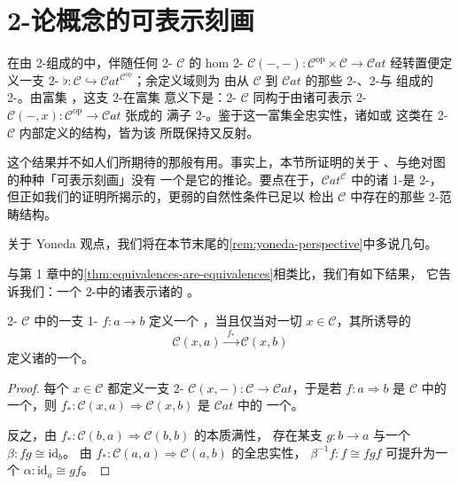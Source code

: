 
\providecommand{\Cat}{\mathcal{C}at}

\section{2-\trCategory{}论概念的可表示刻画}\label{sec:representable-characterizations}

在由 2-\trCategory{}组成的\trCartesianClosed{}\trCategory{}中，伴随任何%
2-\trCategory{} $\mathcal{C}$ 的 hom 2-\trFunctor{}
$\mathcal{C}(-,-)\colon\mathcal{C}^{\mathrm{op}}\times\mathcal{C}\to\Cat$
经转置便定义一支 \trYonedaEmbedding{} 2-\trFunctor{}
$\flat\colon\mathcal{C}\hookrightarrow\Cat^{\mathcal{C}^{\mathrm{op}}}$；余定义域则为
由从 $\mathcal{C}$ 到 $\Cat$ 的那些 2-\trFunctor、2-\trNaturalTransformation{}与%
\trModification{}组成的 2-\trCategory。由富集 \trYonedaLemma，这支 2-\trFunctor{}在富集
意义下是\trFullyFaithful：2-\trCategory{} $\mathcal{C}$ 同构于由诸可表示%
2-\trFunctor{} $\mathcal{C}(-,x)\colon\mathcal{C}^{\mathrm{op}}\to\Cat$ 张成的
满子 2-\trCategory。鉴于这一富集全忠实性，诸如\trEquivalence{}或%
\trAdjunction{}这类在 2-\trCategory{} $\mathcal{C}$ 内部定义的结构，皆为该%
\trYonedaEmbedding{}所既保持又反射。

这个结果并不如人们所期待的那般有用。事实上，本节所证明的关于%
\trEquivalence、\trAdjunction{}与绝对\trLifting{}图的种种「可表示刻画」没有
一个是它的推论。要点在于，$\Cat^{\mathcal{C}}$ 中的诸 1-\trCell{}是%
2-\trNaturalTransformation，但正如我们的证明所揭示的，更弱的自然性条件已足以
检出 $\mathcal{C}$ 中存在的那些 2-范畴结构。

关于 Yoneda 观点，我们将在本节末尾的\cref{rem:yoneda-perspective}中多说几句。

与第 1 章中的\cref{thm:equivalences-are-equivalences}相类比，我们有如下结果，
它告诉我们：一个 2-\trCategory{}中的诸\trEquivalence{}表示诸\trCategory{}的%
\trEquivalence。

\begin{proposition}\label{prop:equivalences-representably-defined}
2-\trCategory{} $\mathcal{C}$ 中的一支 1-\trCell{} $f\colon a\to b$ 定义一个%
\trEquivalence，当且仅当对一切 $x\in\mathcal{C}$，其所诱导的\trFunctor
\[
\mathcal{C}(x,a)\xrightarrow{\;f_{\ast}\;}\mathcal{C}(x,b)
\]
定义诸\trCategory{}的一个\trEquivalence。
\end{proposition}

\begin{proof}
每个 $x\in\mathcal{C}$ 都定义一支 2-\trFunctor{}
$\mathcal{C}(x,-)\colon\mathcal{C}\to\Cat$，于是若 $f\colon a\Rightarrow b$
是 $\mathcal{C}$ 中的一个\trEquivalence，则
$f_{\ast}\colon\mathcal{C}(x,a)\Rightarrow\mathcal{C}(x,b)$ 是 $\Cat$ 中的
一个\trEquivalence。

反之，由 $f_{\ast}\colon\mathcal{C}(b,a)\Rightarrow\mathcal{C}(b,b)$ 的本质满性，
存在某支 $g\colon b\to a$ 与一个\trIsomorphism{} $\beta\colon fg\cong\mathrm{id}_{b}$。
由 $f_{\ast}\colon\mathcal{C}(a,a)\Rightarrow\mathcal{C}(a,b)$ 的全忠实性，%
\trIsomorphism{} $\beta^{-1}f\colon f\cong fgf$ 可提升为一个\trIsomorphism{}
$\alpha\colon\mathrm{id}_{a}\cong gf$。
\end{proof}

